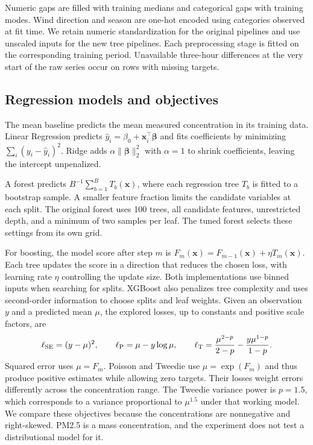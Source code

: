 \documentclass[11pt]{article}
\begin{document}
Numeric gaps are filled with training medians and categorical gaps with training modes. Wind direction and season are one-hot encoded using categories observed at fit time. We retain numeric standardization for the original pipelines and use unscaled inputs for the new tree pipelines. Each preprocessing stage is fitted on the corresponding training period. Unavailable three-hour differences at the very start of the raw series occur on rows with missing targets.

\subsection{Regression models and objectives}
The mean baseline predicts the mean measured concentration in its training data. Linear Regression predicts $\hat y_i=\beta_0+\boldsymbol x_i^\top\boldsymbol\beta$ and fits coefficients by minimizing $\sum_i(y_i-\hat y_i)^2$. Ridge adds $\alpha\|\boldsymbol\beta\|_2^2$ with $\alpha=1$ to shrink coefficients, leaving the intercept unpenalized.

A forest predicts $B^{-1}\sum_{b=1}^{B}T_b(\boldsymbol x)$, where each regression tree $T_b$ is fitted to a bootstrap sample. A smaller feature fraction limits the candidate variables at each split. The original forest uses 100 trees, all candidate features, unrestricted depth, and a minimum of two samples per leaf. The tuned forest selects these settings from its own grid.

For boosting, the model score after step $m$ is $F_m(\boldsymbol x)=F_{m-1}(\boldsymbol x)+\eta T_m(\boldsymbol x)$. Each tree updates the score in a direction that reduces the chosen loss, with learning rate $\eta$ controlling the update size. Both implementations use binned inputs when searching for splits. XGBoost also penalizes tree complexity and uses second-order information to choose splits and leaf weights. Given an observation $y$ and a predicted mean $\mu$, the explored losses, up to constants and positive scale factors, are
\begin{equation}
\ell_{\rm SE}=(y-\mu)^2,\qquad
\ell_{\rm P}=\mu-y\log\mu,\qquad
\ell_{\rm T}=\frac{\mu^{2-p}}{2-p}-\frac{y\mu^{1-p}}{1-p}.
\label{eq:losses}
\end{equation}
Squared error uses $\mu=F_m$. Poisson and Tweedie use $\mu=\exp(F_m)$ and thus produce positive estimates while allowing zero targets. Their losses weight errors differently across the concentration range. The Tweedie variance power is $p=1.5$, which corresponds to a variance proportional to $\mu^{1.5}$ under that working model. We compare these objectives because the concentrations are nonnegative and right-skewed. PM2.5 is a mass concentration, and the experiment does not test a distributional model for it.
\end{document}
